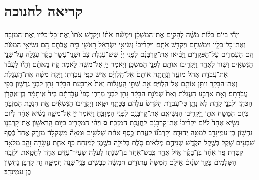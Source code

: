 \documentclass[twoside, openany, parskip=half, 11pt]{book}
\begin{document}
\begin{footnotesize}
\begin{multicols}{2}
\end{multicols}

\section[חנוכה]{קריאה לחנוכה}

\begin{multicols}{2}

וַיְהִ֡י בְּיוֹם֩ כַּלּ֨וֹת מֹשֶׁ֜ה לְהָקִ֣ים אֶת־הַמִּשְׁכָּ֗ן וַיִּמְשַׁ֨ח אֹת֜וֹ וַיְקַדֵּ֤שׁ אֹתוֹ֙ וְאֶת־כָּל־כֵּלָ֔יו וְאֶת־הַמִּזְבֵּ֖חַ וְאֶת־כָּל־כֵּלָ֑יו וַיִּמְשָׁחֵ֖ם וַיְקַדֵּ֥שׁ אֹתָֽם׃ וַיַּקְרִ֨יבוּ֙ נְשִׂיאֵ֣י יִשְׂרָאֵ֔ל רָאשֵׁ֖י בֵּ֣ית אֲבֹתָ֑ם הֵ֚ם נְשִׂיאֵ֣י הַמַּטֹּ֔ת הֵ֥ם הָעֹֽמְדִ֖ים עַל־הַפְּקֻדִֽים׃ וַיָּבִ֨יאוּ אֶת־קָרְבָּנָ֜ם לִפְנֵ֣י יְיָ֗ שֵׁשׁ־עֶגְלֹ֥ת צָב֙ וּשְׁנֵֽי־עָשָׂ֣ר בָּקָ֔ר עֲגָלָ֛ה עַל־שְׁנֵ֥י הַנְּשִׂאִ֖ים וְשׁ֣וֹר לְאֶחָ֑ד וַיַּקְרִ֥יבוּ אוֹתָ֖ם לִפְנֵ֥י הַמִּשְׁכָּֽן׃  
וַיֹּ֥אמֶר יְיָ֖ אֶל־מֹשֶׁ֥ה לֵּאמֹֽר׃ קַ֚ח מֵֽאִתָּ֔ם וְהָי֕וּ לַֽעֲבֹ֕ד אֶת־עֲבֹדַ֖ת אֹ֣הֶל מוֹעֵ֑ד וְנָֽתַתָּ֤ה אוֹתָם֙ אֶל־הַֽלְוִיִּ֔ם אִ֖ישׁ כְּפִ֥י עֲבֹֽדָתֽוֹ׃ וַיִּקַּ֣ח מֹשֶׁ֔ה אֶת־הָֽעֲגָלֹ֖ת וְאֶת־הַבָּקָ֑ר וַיִּתֵּ֥ן אוֹתָ֖ם אֶל־הַֽלְוִיִּֽם׃ אֵ֣ת שְׁתֵּ֣י הָֽעֲגָל֗וֹת וְאֵת֙ אַרְבַּ֣עַת הַבָּקָ֔ר נָתַ֖ן לִבְנֵ֣י גֵֽרְשׁ֑וֹן כְּפִ֖י עֲבֹֽדָתָֽם׃ וְאֵ֣ת אַרְבַּ֣ע הָֽעֲגָלֹ֗ת וְאֵת֙ שְׁמֹנַ֣ת הַבָּקָ֔ר נָתַ֖ן לִבְנֵ֣י מְרָרִ֑י כְּפִי֙ עֲבֹ֣דָתָ֔ם בְּיַד֙ אִֽיתָמָ֔ר בֶּֽן־אַֽהֲרֹ֖ן הַכֹּהֵֽן׃ וְלִבְנֵ֥י קְהָ֖ת לֹ֣א נָתָ֑ן כִּֽי־עֲבֹדַ֤ת הַקֹּ֨דֶשׁ֙ עֲלֵהֶ֔ם בַּכָּתֵ֖ף יִשָּֽׂאוּ׃ וַיַּקְרִ֣יבוּ הַנְּשִׂאִ֗ים אֵ֚ת חֲנֻכַּ֣ת הַמִּזְבֵּ֔חַ בְּי֖וֹם הִמָּשַׁ֣ח אֹת֑וֹ וַיַּקְרִ֧יבוּ הַנְּשִׂיאִ֛ם אֶת־קָרְבָּנָ֖ם לִפְנֵ֥י הַמִּזְבֵּֽחַ׃ וַיֹּ֥אמֶר יְיָ֖ אֶל־מֹשֶׁ֑ה נָשִׂ֨יא אֶחָ֜ד לַיּ֗וֹם נָשִׂ֤יא אֶחָד֙ לַיּ֔וֹם יַקְרִ֨יבוּ֙ אֶת־קָרְבָּנָ֔ם לַֽחֲנֻכַּ֖ת הַמִּזְבֵּֽחַ׃ \textbf{ס}  
וַיְהִ֗י הַמַּקְרִ֛יב בַּיּ֥וֹם הָֽרִאשׁ֖וֹן אֶת־קָרְבָּנ֑וֹ נַחְשׁ֥וֹן בֶּן־עַמִּֽינָדָ֖ב לְמַטֵּ֥ה יְהוּדָֽה׃ וְקָרְבָּנ֞וֹ קַֽעֲרַת־כֶּ֣סֶף אַחַ֗ת שְׁלֹשִׁ֣ים וּמֵאָה֘ מִשְׁקָלָהּ֒ מִזְרָ֤ק אֶחָד֙ כֶּ֔סֶף שִׁבְעִ֥ים שֶׁ֖קֶל בְּשֶׁ֣קֶל הַקֹּ֑דֶשׁ שְׁנֵיהֶ֣ם מְלֵאִ֗ים סֹ֛לֶת בְּלוּלָ֥ה בַשֶּׁ֖מֶן לְמִנְחָֽה׃ כַּ֥ף אַחַ֛ת עֲשָׂרָ֥ה זָהָ֖ב מְלֵאָ֥ה קְטֹֽרֶת׃ פַּ֣ר אֶחָ֞ד בֶּן־בָּקָ֗ר אַ֧יִל אֶחָ֛ד כֶּֽבֶשׂ־אֶחָ֥ד בֶּן־שְׁנָת֖וֹ לְעֹלָֽה׃ שְׂעִיר־עִזִּ֥ים אֶחָ֖ד לְחַטָּֽאת׃ וּלְזֶ֣בַֽח הַשְּׁלָמִים֘ בָּקָ֣ר שְׁנַ֒יִם֒ אֵילִ֤ם חֲמִשָּׁה֙ עַתּוּדִ֣ים חֲמִשָּׁ֔ה כְּבָשִׂ֥ים בְּנֵֽי־שָׁנָ֖ה חֲמִשָּׁ֑ה זֶ֛ה קָרְבַּ֥ן נַחְשׁ֖וֹן בֶּן־עַמִּֽינָדָֽב׃

 

\end{multicols}
\end{footnotesize}
\end{document}
